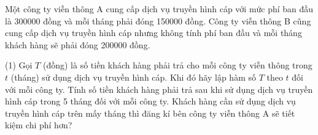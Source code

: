 \begin{bt}%
	Một công ty viễn thông A cung cấp dịch vụ truyền hình cáp với mức phí ban đầu là 300000 đồng và mỗi tháng phải đóng 150000 đồng. Công ty viễn thông B cũng cung cấp dịch vụ truyền hình cáp nhưng không tính phí ban  đầu và mỗi tháng khách hàng sẽ phải đóng 200000 đồng.
	\begin{tasks}(1)
		\task Gọi  $T$ (đồng) là số tiền khách hàng phải trả cho mỗi công ty viễn thông trong $t$ (tháng) sử dụng dịch vụ truyền hình cáp. Khi đó hãy lập hàm số $T$ theo $t$ đối với mỗi công ty.
		\task Tính số tiền khách hàng phải trả sau khi sử dụng dịch vụ truyền hình cáp trong 5 tháng đối  với mỗi công ty.
		\task Khách  hàng cần sử dụng dịch vụ truyền hình cáp trên mấy tháng thì đăng kí bên công ty viễn thông A sẽ tiết kiệm chi phí hơn?
	\end{tasks}
\end{bt}

